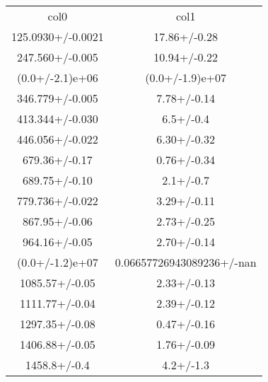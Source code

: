 \begin{table}
\begin{tabular}{cc}
col0 & col1 \\
125.0930+/-0.0021 & 17.86+/-0.28 \\
247.560+/-0.005 & 10.94+/-0.22 \\
(0.0+/-2.1)e+06 & (0.0+/-1.9)e+07 \\
346.779+/-0.005 & 7.78+/-0.14 \\
413.344+/-0.030 & 6.5+/-0.4 \\
446.056+/-0.022 & 6.30+/-0.32 \\
679.36+/-0.17 & 0.76+/-0.34 \\
689.75+/-0.10 & 2.1+/-0.7 \\
779.736+/-0.022 & 3.29+/-0.11 \\
867.95+/-0.06 & 2.73+/-0.25 \\
964.16+/-0.05 & 2.70+/-0.14 \\
(0.0+/-1.2)e+07 & 0.06657726943089236+/-nan \\
1085.57+/-0.05 & 2.33+/-0.13 \\
1111.77+/-0.04 & 2.39+/-0.12 \\
1297.35+/-0.08 & 0.47+/-0.16 \\
1406.88+/-0.05 & 1.76+/-0.09 \\
1458.8+/-0.4 & 4.2+/-1.3 \\
\end{tabular}
\end{table}
